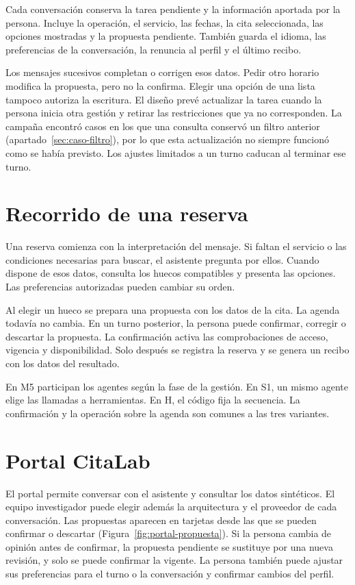Cada conversación conserva la tarea pendiente y la información aportada por la
persona. Incluye la operación, el servicio, las fechas, la cita seleccionada,
las opciones mostradas y la propuesta pendiente. También guarda el idioma,
las preferencias de la conversación, la renuncia al perfil y el último recibo.

Los mensajes sucesivos completan o corrigen esos datos. Pedir otro horario
modifica la propuesta, pero no la confirma. Elegir una opción de una lista
tampoco autoriza la escritura. El diseño prevé actualizar la tarea cuando la
persona inicia otra gestión y retirar las restricciones que ya no corresponden.
La campaña encontró casos en los que una consulta conservó un filtro anterior
(apartado~\ref{sec:caso-filtro}), por lo que esta actualización no siempre
funcionó como se había previsto. Los ajustes limitados a un turno caducan al
terminar ese turno.

\section{Recorrido de una reserva}

Una reserva comienza con la interpretación del mensaje. Si faltan el servicio
o las condiciones necesarias para buscar, el asistente pregunta por ellos.
Cuando dispone de esos datos, consulta los huecos compatibles y presenta las
opciones. Las preferencias autorizadas pueden cambiar su orden.

Al elegir un hueco se prepara una propuesta con los datos de la cita. La agenda
todavía no cambia. En un turno posterior, la persona puede confirmar, corregir
o descartar la propuesta. La confirmación activa las comprobaciones de acceso,
vigencia y disponibilidad. Solo después se registra la reserva y se genera un
recibo con los datos del resultado.

En M5 participan los agentes según la fase de la gestión. En S1, un mismo agente
elige las llamadas a herramientas. En H, el código fija la secuencia. La
confirmación y la operación sobre la agenda son comunes a las tres variantes.

\section{Portal CitaLab}

El portal permite conversar con el asistente y consultar los datos sintéticos.
El equipo investigador puede elegir además la arquitectura y el proveedor de
cada conversación. Las propuestas aparecen en tarjetas desde
las que se pueden confirmar o descartar (Figura~\ref{fig:portal-propuesta}).
Si la persona cambia de opinión antes de confirmar, la propuesta pendiente se
sustituye por una nueva revisión, y solo se puede confirmar la vigente.
La persona también puede ajustar sus preferencias para el turno o la
conversación y confirmar cambios del perfil.

